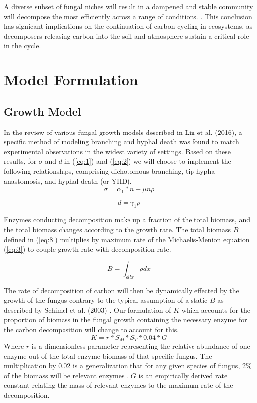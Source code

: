 \documentclass[12pt]{article}
\begin{document}
\begin{multicols}{2}
A diverse subset of fungal niches will result in a dampened and stable community will decompose the most efficiently across a range of conditions. \cite{Toljander2006}. This conclusion has signicant implications on the continuation of carbon cycling in ecosystems, as decomposers releasing carbon into the soil and atmosphere sustain a critical role in the cycle. \cite{Lustenhouwer2020}

\section{Model Formulation}


\subsection{Growth Model}
In the review of various fungal growth models described in Lin et al. (2016), a specific method of modeling branching and hyphal death was found to match experimental observations in the widest variety of settings. Based on these results, for $\sigma$ and $d$ in (\ref{eq:1}) and (\ref{eq:2}) we will choose to implement the following relationships, comprising dichotomous branching, tip-hypha anastomosis, and hyphal death (or YHD). 
\begin{equation} 
\sigma = \alpha_{1}*n - \mu n \rho
\end{equation}

\begin{equation}
d = \gamma_{1}\rho
\end{equation}

Enzymes conducting decomposition make up a fraction of the total biomass, and the total biomass changes according to the growth rate. The total biomass $B$ defined in (\ref{eq:8}) multiplies by maximum rate of the Michaelis-Menion equation (\ref{eq:3}) to couple growth rate with decomposition rate. 

\begin{equation} \label {eq:8}
B = \int_{all x}\rho dx
\end{equation}

The rate of decomposition of carbon will then be dynamically effected by the growth of the fungus contrary to the typical assumption of a static $B$ as described by Schimel et al. (2003) \cite{Schimel2003}. Our formulation of $K$ which accounts for the proportion of biomass in the fungal growth containing the necessary enzyme for the carbon decomposition will change to account for this. 
\begin{equation} \label {eq}
K = r*S_{M}*S_{T}*0.04*G
\end{equation}
Where $r$ is a dimensionless parameter representing the relative abundance of one enzyme out of the total enzyme biomass of that specific fungus. The multiplication by $0.02$ is a generalization that for any given species of fungus, 2\% of the biomass will be relevant enzymes \cite{Moorhead2006}. $G$ is an empirically derived rate constant relating the mass of relevant enzymes to the maximum rate of the decomposition.


\end{multicols}
\end{document}
